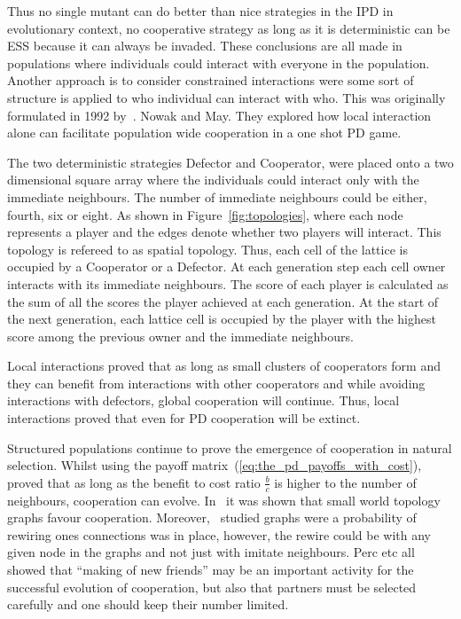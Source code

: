 \documentclass{article}
\theoremstyle{definition}
\begin{document}
Thus no single mutant can do better than nice strategies in the IPD in
evolutionary context, no cooperative strategy as long as it is deterministic can
be ESS because it can always be invaded. These conclusions are all made in
populations where individuals could interact with everyone in the population.
Another approach is to consider constrained interactions were some sort of
structure is applied to who individual can interact with who. This was
originally formulated in 1992 by~\cite{Nowak1992b}. Nowak and May. They explored
how local interaction alone can facilitate population wide cooperation in a one
shot PD game.

The two deterministic strategies Defector and Cooperator, were placed onto a two
dimensional square array where the individuals could interact only with the immediate
neighbours. The number of immediate neighbours could be either, fourth, six or eight.
As shown in Figure~\ref{fig:topologies}, where each node represents a player and
the edges denote whether two players will interact. This topology is refereed to
as spatial topology. Thus, each cell of the lattice is occupied by a Cooperator
or a Defector. At each generation step each cell owner interacts with its immediate
neighbours. The score of each player is calculated as the sum of all the scores the player
achieved at each generation. At the start of the next generation, each lattice
cell is occupied by the player with the highest score among the previous owner
and the immediate neighbours.

Local interactions proved that as long as small clusters of cooperators form and
they can benefit from interactions with other cooperators and while avoiding
interactions with defectors, global cooperation will continue. Thus, local
interactions proved that even for PD cooperation will be extinct.

Structured populations continue to prove the emergence of cooperation in natural
selection. Whilst using the payoff matrix~(\ref{eq:the_pd_payoffs_with_cost}),
~\cite{Ohtsuki2006} proved that as long as the benefit to cost ratio
\(\frac{b}{c}\) is higher to the number of neighbours, cooperation can evolve.
In~\cite{MASUDA2003} it was shown that small world topology graphs favour
cooperation. Moreover,~\cite{Perc2011} studied graphs were a probability of
rewiring ones connections was in place, however, the rewire could be with any
given node in the graphs and not just with imitate neighbours. Perc etc all
showed that ``making of new friends'' may be an important activity for the
successful evolution of cooperation, but also that partners must be selected
carefully and one should keep their number limited.
\end{document}
